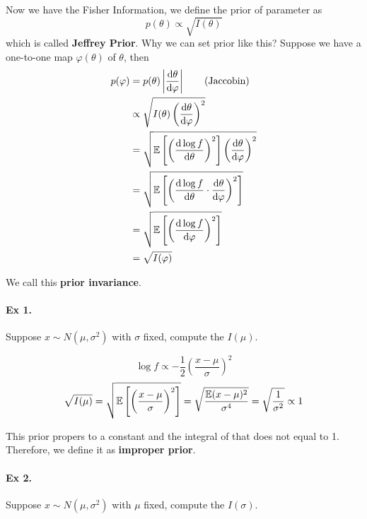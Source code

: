 Now we have the Fisher Information, we define the prior of parameter as 
$$p(\theta)\propto \sqrt{I(\theta)}$$ which is called \textbf{Jeffrey Prior}. Why we can set prior like this? Suppose we have a one-to-one map $\varphi(\theta)$ of $\theta$, then
	\begin{align*}
		p(\varphi)&=p(\theta)\left|\frac{\mathrm{d} \theta}{\mathrm{d} \varphi}\right|  \tag{Jaccobin}\\
		&\propto \sqrt{I(\theta)\left(\frac{\mathrm{d} \theta}{\mathrm{d} \varphi}\right)^2}\\
		&=\sqrt{\mathbb{E}\left[\left(\frac{\mathrm{d} \log f}{\mathrm{d}\theta}\right)^2\right]\left(\frac{\mathrm{d}\theta}{\mathrm{d}\varphi}\right)^2}\\
		&=\sqrt{\mathbb{E}\left[\left(\frac{\mathrm{d} \log f}{\mathrm{d}\theta}\cdot\frac{\mathrm{d}\theta}{\mathrm{d}\varphi}\right)^2\right]}\\
		&=\sqrt{\mathbb{E}\left[\left(\frac{\mathrm{d}\log f}{\mathrm{d}\varphi}\right)^2\right]}\\
		&=\sqrt{I(\varphi)}
	\end{align*}

We call this \textbf{prior invariance}.


	\paragraph{Ex 1.} Suppose $x\sim N(\mu, \sigma^2)$ with $\sigma$ fixed, compute the $I(\mu)$.
	
	$$\log f\propto -\frac{1}{2}\left(\frac{x-\mu}{\sigma}\right)^2$$
	$$\sqrt{I(\mu)}=\sqrt{\mathbb{E}\left[\left(\frac{x-\mu}{\sigma}\right)^2\right]}=\sqrt{\frac{\mathbb{E}(x-\mu)^2}{\sigma^4}}=\sqrt{\frac{1}{\sigma^2}}\propto 1$$
	
	This prior propers to a constant and the integral of that does not equal to 1. Therefore, we define it as \textbf{improper prior}.
	
	\paragraph{Ex 2.} Suppose $x\sim N(\mu, \sigma^2)$ with $\mu$ fixed, compute the $I(\sigma)$.
	
